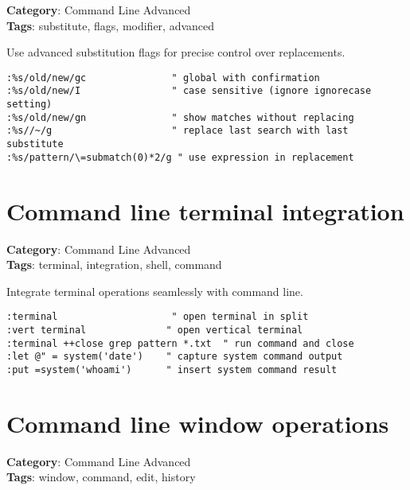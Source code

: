 {{{{\textbf{Category}: Command Line Advanced\\ \textbf{Tags}: substitute, flags, modifier, advanced
\vspace{0.5cm}

Use advanced substitution flags for precise control over replacements.

\begin{Exa*}{}
\begin{Verbatim}[fontsize=\footnotesize, breaklines, breakanywhere]
:%s/old/new/gc               " global with confirmation
:%s/old/new/I                " case sensitive (ignore ignorecase setting)  
:%s/old/new/gn               " show matches without replacing
:%s//~/g                     " replace last search with last substitute
:%s/pattern/\=submatch(0)*2/g " use expression in replacement
\end{Verbatim}
\end{Exa*}

\section{Command line terminal integration}

\textbf{Category}: Command Line Advanced\\ \textbf{Tags}: terminal, integration, shell, command
\vspace{0.5cm}

Integrate terminal operations seamlessly with command line.

\begin{Exa*}{}
\begin{Verbatim}[fontsize=\footnotesize, breaklines, breakanywhere]
:terminal                    " open terminal in split
:vert terminal              " open vertical terminal
:terminal ++close grep pattern *.txt  " run command and close
:let @" = system('date')    " capture system command output
:put =system('whoami')      " insert system command result
\end{Verbatim}
\end{Exa*}

\section{Command line window operations}

\textbf{Category}: Command Line Advanced\\ \textbf{Tags}: window, command, edit, history
\vspace{0.5cm}

}}}}
